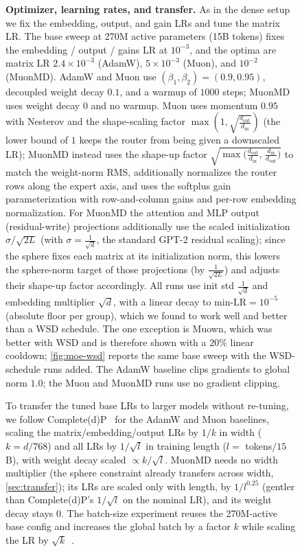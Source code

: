 \documentclass[10pt]{article} %
\newcommand{\dout}{d_{\text{out}}}
\newcommand{\din}{d_{\text{in}}}
\begin{document}
\begin{figure}[t]
\textbf{Optimizer, learning rates, and transfer.} As in the dense setup we fix the embedding, output, and gain LRs and tune the matrix LR. The base sweep at 270M active parameters (15B tokens) fixes the embedding / output / gains LR at $10^{-3}$, and the optima are matrix LR $2.4\!\times\!10^{-3}$ (AdamW), $5\!\times\!10^{-3}$ (Muon), and $10^{-2}$ (MuonMD). AdamW and Muon use $(\beta_1,\beta_2)=(0.9,0.95)$, decoupled weight decay $0.1$, and a warmup of $1000$ steps; MuonMD uses weight decay $0$ and no warmup. Muon uses momentum $0.95$ with Nesterov and the shape-scaling factor $\max(1,\sqrt{\frac{\dout}{\din}})$ (the lower bound of $1$ keeps the router from being given a downscaled LR); MuonMD instead uses the shape-up factor $\sqrt{\max\!\big(\frac{\dout}{\din},\, \frac{\din}{\dout}\big)}$ to match the weight-norm RMS, additionally normalizes the router rows along the expert axis, and uses the softplus gain parameterization with row-and-column gains and per-row embedding normalization. For MuonMD the attention and MLP output (residual-write) projections additionally use the scaled initialization $\sigma/\sqrt{2L}$ (with $\sigma=\frac{1}{\sqrt{d}}$, the standard GPT-2 residual scaling); since the sphere fixes each matrix at its initialization norm, this lowers the sphere-norm target of those projections (by $\frac{1}{\sqrt{2L}}$) and adjusts their shape-up factor accordingly. All runs use init std $\frac{1}{\sqrt{d}}$ and embedding multiplier $\sqrt{d}$, with a linear decay to $\text{min-LR}=10^{-5}$ (absolute floor per group), which we found to work well and better than a WSD schedule. The one exception is Muown, which was better with WSD and is therefore shown with a $20\%$ linear cooldown; \autoref{fig:moe-wsd} reports the same base sweep with the WSD-schedule runs added. The AdamW baseline clips gradients to global norm $1.0$; the Muon and MuonMD runs use no gradient clipping.

To transfer the tuned base LRs to larger models without re-tuning, we follow Complete(d)P~\citep{dey2025completep,mlodozeniec2025completed} for the AdamW and Muon baselines, scaling the matrix/embedding/output LRs by $1/k$ in width ($k=d/768$) and all LRs by $1/\sqrt{l}$ in training length ($l=$ tokens$/15$B), with weight decay scaled $\propto k/\sqrt{l}$. MuonMD needs no width multiplier (the sphere constraint already transfers across width, \autoref{sec:transfer}); its LRs are scaled only with length, by $1/l^{0.25}$ (gentler than Complete(d)P's $1/\sqrt{l}$ on the nominal LR), and its weight decay stays $0$. The batch-size experiment reuses the 270M-active base config and increases the global batch by a factor $k$ while scaling the LR by $\sqrt{k}$~\citep{malladi2022sdes}.


\end{figure}
\end{document}

